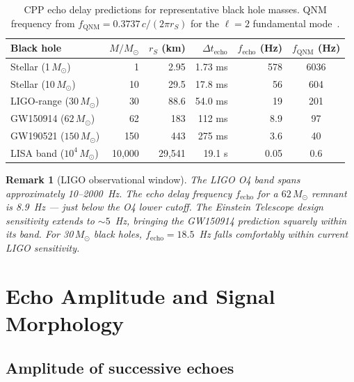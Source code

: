 \documentclass[12pt]{article}
\newtheorem{remark}[theorem]{Remark}
\newcommand{\rS}{r_S}
\newcommand{\Dt}{\Delta t_{\mathrm{echo}}}
\begin{document}
\begin{table}[h]
\centering
\caption{CPP echo delay predictions for representative black hole masses.
QNM frequency from $f_{\mathrm{QNM}} = 0.3737\,c/(2\pi\rS)$ for the
$\ell = 2$ fundamental mode~\cite{berti2009}.}
\label{tab:echoes}
\renewcommand{\arraystretch}{1.35}
\begin{tabular}{@{}lrrrrc@{}}
\toprule
Black hole & $M/M_\odot$ & $\rS$ (km) & $\Dt$ & $f_{\mathrm{echo}}$ (Hz)
  & $f_{\mathrm{QNM}}$ (Hz) \\
\midrule
Stellar (1\,$M_\odot$)       &      1 &     2.95 &   1.73 ms &    578 & 6036 \\
Stellar (10\,$M_\odot$)      &     10 &    29.5  &  17.8 ms  &     56 &  604 \\
LIGO-range (30\,$M_\odot$)   &     30 &    88.6  &  54.0 ms  &     19 &  201 \\
GW150914 ($62\,M_\odot$)     &     62 &   183    & 112 ms    &    8.9 &   97 \\
GW190521 ($150\,M_\odot$)    &    150 &   443    & 275 ms    &    3.6 &   40 \\
LISA band ($10^4\,M_\odot$)  & 10,000 & 29,541   & 19.1 s    &   0.05 &  0.6 \\
\bottomrule
\end{tabular}
\end{table}

\begin{remark}[LIGO observational window]
The LIGO O4 band spans approximately 10--2000~Hz.  The echo delay
frequency $f_{\mathrm{echo}}$ for a $62\,M_\odot$ remnant is 8.9~Hz
— just below the O4 lower cutoff.  The Einstein Telescope design
sensitivity extends to $\sim\!5$~Hz, bringing the GW150914 prediction
squarely within its band.  For 30\,$M_\odot$ black holes,
$f_{\mathrm{echo}} = 18.5$~Hz falls comfortably within current LIGO
sensitivity.
\end{remark}

\section{Echo Amplitude and Signal Morphology}
\label{sec:amplitude}

\subsection{Amplitude of successive echoes}
\end{document}

